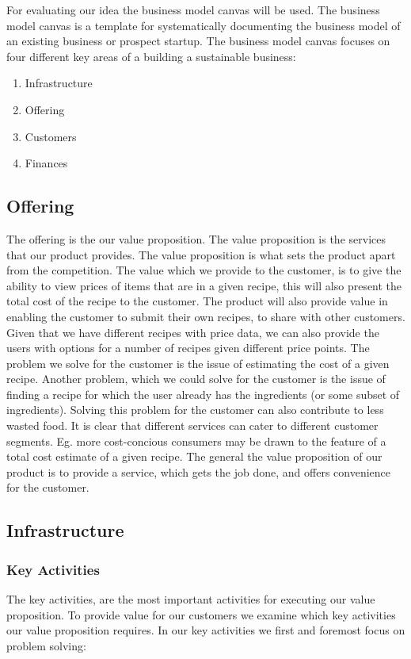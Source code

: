 \documentclass{article}
\begin{document}
For evaluating our idea the business model canvas will be used. The business model canvas
is a template for systematically documenting the business model of an existing business or
prospect startup. The business model canvas focuses on four different key areas of a
building a sustainable business: \begin{enumerate}[itemsep=0pt]
  \item Infrastructure
  \item Offering
  \item Customers
  \item Finances
\end{enumerate}

\subsection{Offering}
The offering is the our value proposition. The value proposition is the services that our
product provides. The value proposition is what sets the product apart from the
competition. The value which we provide to the customer, is to give the ability to view
prices of items that are in a given recipe, this will also present the total cost of the
recipe to the customer. The product will also provide value in enabling the customer to
submit their own recipes, to share with other customers. Given that we have different
recipes with price data, we can also provide the users with options for a number of
recipes given different price points. The problem we solve for the customer is the
issue of estimating the cost of a given recipe.  Another problem, which we could solve for
the customer is the issue of finding a recipe for which the user already has the
ingredients (or some subset of ingredients). Solving this problem for the customer can
also contribute to less wasted food. It is clear that different services can cater to
different customer segments.  Eg. more cost-concious consumers may be drawn to the feature
of a total cost estimate of a given recipe. The general the value proposition of our
product is to provide a service, which gets the job done, and offers convenience for the
customer. 


\subsection{Infrastructure}
\subsubsection{Key Activities}
The key activities, are the most important activities for executing our value proposition.
To provide value for our customers we examine which key activities our value proposition
requires. In our key activities we first and foremost focus on problem solving:
\end{document}
